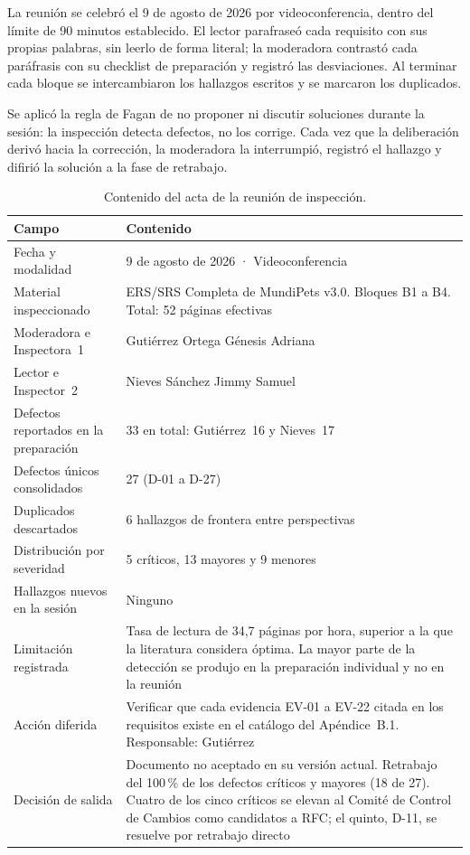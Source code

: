 \documentclass[journal,onecolumn]{IEEEtran}
\begin{document}
	La reunión se celebró el 9 de agosto de 2026 por videoconferencia, dentro
	del límite de 90 minutos establecido. El lector parafraseó cada requisito
	con sus propias palabras, sin leerlo de forma literal; la moderadora
	contrastó cada paráfrasis con su checklist de preparación y registró las
	desviaciones. Al terminar cada bloque se intercambiaron los hallazgos
	escritos y se marcaron los duplicados.
	
	Se aplicó la regla de Fagan de no proponer ni discutir soluciones durante la
	sesión: la inspección detecta defectos, no los corrige. Cada vez que la
	deliberación derivó hacia la corrección, la moderadora la interrumpió,
	registró el hallazgo y difirió la solución a la fase de retrabajo.
	
	\begin{table}[h!]
		\centering
		\caption{Contenido del acta de la reunión de inspección.}
		\label{tab:acta-reunion}
		\begin{tabular}{p{4cm} p{9.5cm}}
			\toprule
			\textbf{Campo} & \textbf{Contenido} \\
			\midrule
			Fecha y modalidad & 9 de agosto de 2026 · Videoconferencia \\
			Material inspeccionado & ERS/SRS Completa de MundiPets v3.0.
			Bloques B1 a B4. Total: 52 páginas efectivas \\
			Moderadora e Inspectora~1 & Gutiérrez Ortega Génesis Adriana \\
			Lector e Inspector~2 & Nieves Sánchez Jimmy Samuel \\
			Defectos reportados en la preparación & 33 en total: Gutiérrez~16 y
			Nieves~17 \\
			Defectos únicos consolidados & 27 (D-01 a D-27) \\
			Duplicados descartados & 6 hallazgos de frontera entre perspectivas \\
			Distribución por severidad & 5 críticos, 13 mayores y 9 menores \\
			Hallazgos nuevos en la sesión & Ninguno \\
			Limitación registrada & Tasa de lectura de 34,7 páginas por hora,
			superior a la que la literatura considera óptima. La mayor parte de
			la detección se produjo en la preparación individual y no en la
			reunión \\
			Acción diferida & Verificar que cada evidencia EV-01 a EV-22 citada
			en los requisitos existe en el catálogo del Apéndice~B.1.
			Responsable: Gutiérrez \\
			Decisión de salida & Documento no aceptado en su versión actual.
			Retrabajo del 100\,\% de los defectos críticos y mayores (18 de 27).
			Cuatro de los cinco críticos se elevan al Comité de Control de
			Cambios como candidatos a RFC; el quinto, D-11, se resuelve por
			retrabajo directo \\
			\bottomrule
		\end{tabular}
	\end{table}
	
\end{document}

